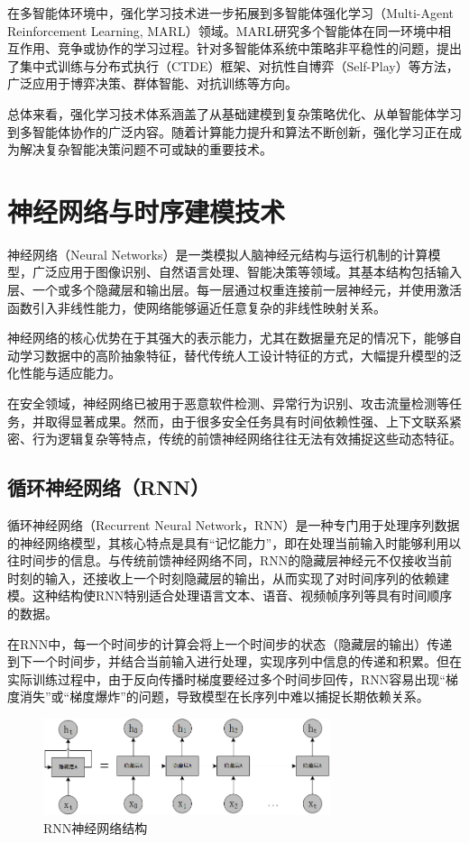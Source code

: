 在多智能体环境中，强化学习技术进一步拓展到多智能体强化学习（Multi-Agent Reinforcement Learning, MARL）领域。MARL研究多个智能体在同一环境中相互作用、竞争或协作的学习过程。针对多智能体系统中策略非平稳性的问题，提出了集中式训练与分布式执行（CTDE）框架、对抗性自博弈（Self-Play）等方法，广泛应用于博弈决策、群体智能、对抗训练等方向。

总体来看，强化学习技术体系涵盖了从基础建模到复杂策略优化、从单智能体学习到多智能体协作的广泛内容。随着计算能力提升和算法不断创新，强化学习正在成为解决复杂智能决策问题不可或缺的重要技术。

\section{神经网络与时序建模技术}

神经网络（Neural Networks）是一类模拟人脑神经元结构与运行机制的计算模型，广泛应用于图像识别、自然语言处理、智能决策等领域。其基本结构包括输入层、一个或多个隐藏层和输出层。每一层通过权重连接前一层神经元，并使用激活函数引入非线性能力，使网络能够逼近任意复杂的非线性映射关系。

神经网络的核心优势在于其强大的表示能力，尤其在数据量充足的情况下，能够自动学习数据中的高阶抽象特征，替代传统人工设计特征的方式，大幅提升模型的泛化性能与适应能力。

在安全领域，神经网络已被用于恶意软件检测、异常行为识别、攻击流量检测等任务，并取得显著成果。然而，由于很多安全任务具有时间依赖性强、上下文联系紧密、行为逻辑复杂等特点，传统的前馈神经网络往往无法有效捕捉这些动态特征。

\subsection{循环神经网络（RNN）}

循环神经网络（Recurrent Neural Network，RNN）是一种专门用于处理序列数据的神经网络模型，其核心特点是具有“记忆能力”，即在处理当前输入时能够利用以往时间步的信息。与传统前馈神经网络不同，RNN的隐藏层神经元不仅接收当前时刻的输入，还接收上一个时刻隐藏层的输出，从而实现了对时间序列的依赖建模。这种结构使RNN特别适合处理语言文本、语音、视频帧序列等具有时间顺序的数据。

在RNN中，每一个时间步的计算会将上一个时间步的状态（隐藏层的输出）传递到下一个时间步，并结合当前输入进行处理，实现序列中信息的传递和积累。但在实际训练过程中，由于反向传播时梯度要经过多个时间步回传，RNN容易出现“梯度消失”或“梯度爆炸”的问题，导致模型在长序列中难以捕捉长期依赖关系。

\begin{figure}[hbt]
	\centering
	\includegraphics[width=0.75\textwidth]{figures/2.4}
	\caption{RNN神经网络结构}\label{fig:2.4}
\end{figure}

